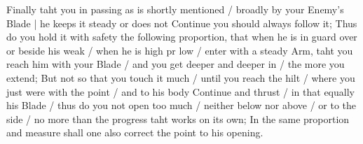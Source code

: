 Finally taht you in passing as is shortly mentioned / broadly by your
Enemy's Blade | he keeps it steady or does not Continue you should
always follow it; Thus do you hold it with safety the following
proportion, that when he is in guard over or beside his weak / when he
is high pr low / enter with a steady Arm, taht you reach him with your
Blade / and you get deeper and deeper in / the more you extend; But
not so that you touch it much / until you reach the hilt / where you
just were with the point / and to his body Continue and thrust / in
that equally his Blade / thus do you not open too much / neither below
nor above / or to the side / no more than the progress taht works on
its own; In the same proportion and measure shall one also correct the
point to his opening.



